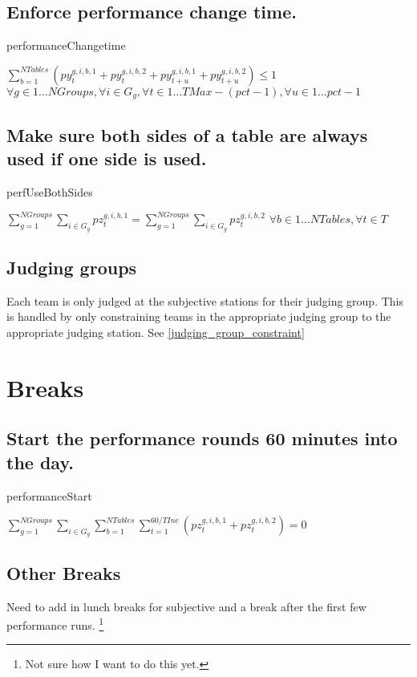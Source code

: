 \documentclass[letterpaper,11pt]{report}
\newcommand{\doccomment}[3]%
{\marginpar{\textcolor{#2}{\bf #1}}%
\footnote{{\color{#2}#3}}%
}
\newcommand{\doccomment}[3]{}
\newcommand{\jpscomment}[1]%
{\doccomment{SCHEWE}{Bittersweet}{#1}}
\begin{document}
\FloatBarrier
\subsection{Enforce performance change time.}
\begin{algorithm}
\caption{performanceChangetime}
$
\sum\limits_{b=1}^{NTables} (
py_{t}^{g,i,b,1} + py_{t}^{g,i,b,2}
+
py_{t+u}^{g,i,b,1} + py_{t+u}^{g,i,b,2})
\le 1$
\hfill $
\forall g \in 1 \dots NGroups,
\forall i \in G_{g}, 
\forall t \in 1 \dots TMax - (pct - 1),
\forall u \in 1 \dots pct-1$
\end{algorithm}

\FloatBarrier
\subsection{Make sure both sides of a table are always used if one side is
  used.}
\begin{algorithm}
\caption{perfUseBothSides}
$\sum\limits_{g=1}^{NGroups}\sum\limits_{i \in G_{g}} pz_{t}^{g,i,b,1} 
= 
\sum\limits_{g=1}^{NGroups}\sum\limits_{i \in G_{g}}pz_{t}^{g,i,b,2}$
\hfill $
\forall b \in 1 \dots NTables,
\forall t \in T$
\end{algorithm}


\FloatBarrier
\subsection{Judging groups}
Each team is only judged at the subjective stations for their judging
group. This is handled by only constraining teams in the appropriate
judging group to the appropriate judging station. See \autoref{judging_group_constraint}


\FloatBarrier
\section{Breaks}
\subsection{Start the performance rounds 60 minutes into the day.}
\begin{algorithm}
\caption{performanceStart}
$
\sum\limits_{g=1}^{NGroups}
\sum\limits_{i \in G_{g}} 
  \sum\limits_{b=1}^{NTables} 
    \sum\limits_{t = 1}^{60/TInc} 
      ( pz_{t}^{g,i,b,1} + pz_{t}^{g,i,b,2} ) = 0$
\end{algorithm}
    
\subsection{Other Breaks}
Need to add in lunch breaks for subjective and a break after the first few
performance runs. \jpscomment{Not sure how I want to do this yet.}
\end{document}
